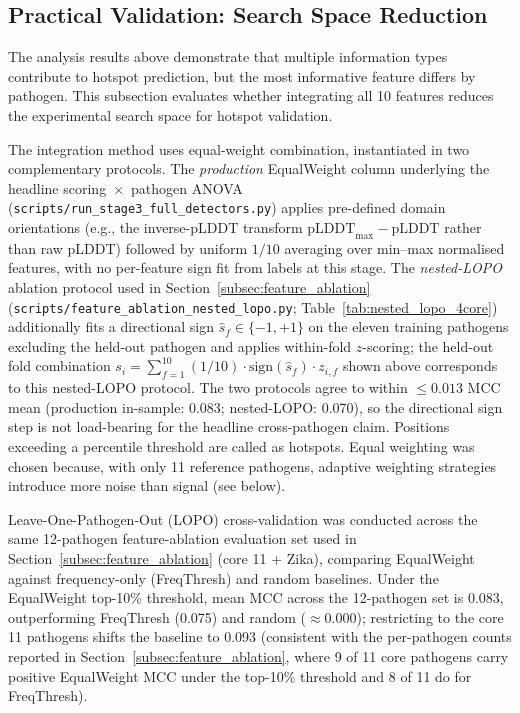 \subsection{Practical Validation: Search Space Reduction}
\label{subsec:search_space_reduction}

The analysis results above demonstrate that multiple information types contribute to hotspot prediction, but the most informative feature differs by pathogen. This subsection evaluates whether integrating all 10 features reduces the experimental search space for hotspot validation.

The integration method uses equal-weight combination, instantiated in two complementary protocols. The \emph{production} EqualWeight column underlying the headline scoring~$\times$~pathogen ANOVA (\texttt{scripts/run\_stage3\_full\_detectors.py}) applies pre-defined domain orientations (e.g., the inverse-pLDDT transform $\text{pLDDT}_{\max} - \text{pLDDT}$ rather than raw pLDDT) followed by uniform $1/10$ averaging over min--max normalised features, with no per-feature sign fit from labels at this stage. The \emph{nested-LOPO} ablation protocol used in Section~\ref{subsec:feature_ablation} (\texttt{scripts/feature\_ablation\_nested\_lopo.py}; Table~\ref{tab:nested_lopo_4core}) additionally fits a directional sign $\hat{s}_f \in \{-1, +1\}$ on the eleven training pathogens excluding the held-out pathogen and applies within-fold $z$-scoring; the held-out fold combination $s_i = \sum_{f=1}^{10} (1/10) \cdot \mathrm{sign}(\hat{s}_f) \cdot z_{i,f}$ shown above corresponds to this nested-LOPO protocol. The two protocols agree to within $\le 0.013$ MCC mean (production in-sample: 0.083; nested-LOPO: 0.070), so the directional sign step is not load-bearing for the headline cross-pathogen claim. Positions exceeding a percentile threshold are called as hotspots. Equal weighting was chosen because, with only 11 reference pathogens, adaptive weighting strategies introduce more noise than signal (see below).

Leave-One-Pathogen-Out (LOPO) cross-validation was conducted across the same 12-pathogen feature-ablation evaluation set used in Section~\ref{subsec:feature_ablation} (core 11 + Zika), comparing EqualWeight against frequency-only (FreqThresh) and random baselines.
Under the EqualWeight top-10\% threshold, mean MCC across the 12-pathogen set is 0.083, outperforming FreqThresh (0.075) and random ($\approx 0.000$); restricting to the core 11 pathogens shifts the baseline to 0.093 (consistent with the per-pathogen counts reported in Section~\ref{subsec:feature_ablation}, where 9 of 11 core pathogens carry positive EqualWeight MCC under the top-10\% threshold and 8 of 11 do for FreqThresh).

